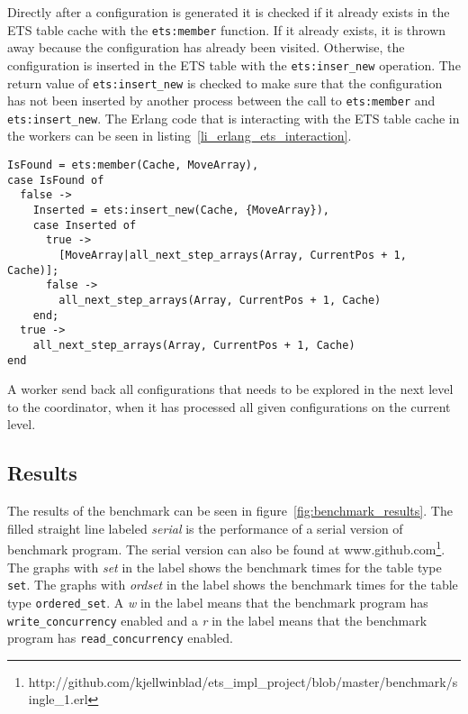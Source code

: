 \documentclass[aps,pre,preprint,nofootinbib]{revtex4}
\begin{document}
    Directly after a configuration is generated it is checked if it already exists in the ETS table cache with the \verb|ets:member| function.
    If it already exists, it is thrown away because the configuration has already been visited.
    Otherwise, the configuration is inserted in the ETS table with the \verb|ets:inser_new| operation.
    The return value of \verb|ets:insert_new| is checked to make sure that the configuration has not been inserted by another process between the call to \verb|ets:member| and \verb|ets:insert_new|.
    The Erlang code that is interacting with the ETS table cache in the workers can be seen in listing~\ref{li_erlang_ets_interaction}.

    \lstset{language=erlang, caption=Worker code that is interacting with ETS, label=li_erlang_ets_interaction} 
\begin{lstlisting}[float=htb] 
IsFound = ets:member(Cache, MoveArray),
case IsFound of
  false ->
    Inserted = ets:insert_new(Cache, {MoveArray}),
    case Inserted of
      true ->
        [MoveArray|all_next_step_arrays(Array, CurrentPos + 1, Cache)];
      false ->
        all_next_step_arrays(Array, CurrentPos + 1, Cache)
    end;
  true ->
    all_next_step_arrays(Array, CurrentPos + 1, Cache)
end
\end{lstlisting}
    
    A worker send back all configurations that needs to be explored in the next level to the coordinator, when it has processed all given configurations on the current level.


\subsection{Results}

  The results of the benchmark can be seen in figure~\ref{fig:benchmark_results}.
  The filled straight line labeled \emph{serial} is the performance of a serial version of benchmark program.
  The serial version can also be found at www.github.com\footnote{http://github.com/kjellwinblad/ets\_impl\_project/blob/master/benchmark/single\_1.erl}.
  The graphs with \emph{set} in the label shows the benchmark times for the table type \verb|set|.
  The graphs with \emph{ordset} in the label shows the benchmark times for the table type \verb|ordered_set|.
  A \emph{w} in the label means that the benchmark program has \verb|write_concurrency| enabled and a \emph{r} in the label means that the benchmark program has \verb|read_concurrency| enabled.
  
\end{document}

